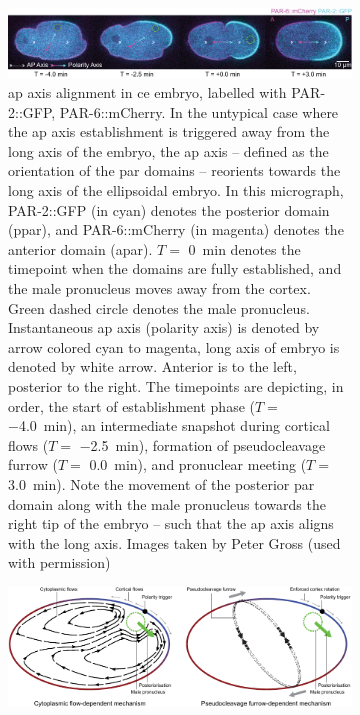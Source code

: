 \begin{figure}

\centering
\begin{subfigure}{\textwidth}
    \centering
    \includegraphics[width=\textwidth]{Introduction/FigureApAxisAlignment/micrograph.pdf}
    \caption{\acs{ap} axis alignment in \acs{ce} embryo, labelled with PAR-2::GFP, PAR-6::mCherry. In the untypical case where the \acs{ap} axis establishment is triggered away from the long axis of the embryo, the \acs{ap} axis -- defined as the orientation of the \acs{par} domains -- reorients towards the long axis of the ellipsoidal embryo. In this micrograph, PAR-2::GFP (in cyan) denotes the posterior domain (\acs{ppar}), and PAR-6::mCherry (in magenta) denotes the anterior domain (\acs{apar}). $T = $ \SI{0}{\minute} denotes the timepoint when the domains are fully established, and the male pronucleus moves away from the cortex. Green dashed circle denotes the male pronucleus. Instantaneous \acs{ap} axis (polarity axis) is denoted by arrow colored cyan to magenta, long axis of embryo is denoted by white arrow. Anterior is to the left, posterior to the right. The timepoints are depicting, in order, the start of establishment phase ($T = $ \SI{-4.0}{\minute}), an intermediate snapshot during cortical flows ($T = $ \SI{-2.5}{\minute}), formation of pseudocleavage furrow ($T = $ \SI{0.0}{\minute}), and pronuclear meeting ($T = $ \SI{3.0}{\minute}). Note the movement of the posterior \acs{par} domain along with the male pronucleus towards the right tip of the embryo -- such that the \acs{ap} axis aligns with the long axis. Images taken by Peter Gross \citep{gross2019guiding} (used with permission)} 
    \label{subfig:apAxisAlignment-micrograph}
\end{subfigure}
\hfill
\begin{subfigure}{\textwidth}
    \centering
    \includegraphics[width=\textwidth]{Introduction/FigureApAxisAlignment/mechanisms.pdf}

\end{subfigure}
\end{figure}

